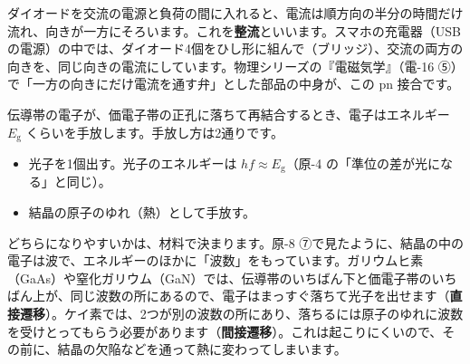 ダイオードを交流の電源と負荷の間に入れると、電流は順方向の半分の時間だけ流れ、向きが一方にそろいます。これを\textbf{整流}といいます。スマホの充電器（USB の電源）の中では、ダイオード4個をひし形に組んで（ブリッジ）、交流の両方の向きを、同じ向きの電流にしています。物理シリーズの『電磁気学』（電-16 ⑤）で「一方の向きにだけ電流を通す弁」とした部品の中身が、この pn 接合です。

\begin{phmodel}[理想ダイオードの式]
\end{phmodel}

\label{ph:原-9:sec8}
伝導帯の電子が、価電子帯の正孔に落ちて再結合するとき、電子はエネルギー $E_{\mathrm g}$ くらいを手放します。手放し方は2通りです。
\begin{itemize}[label={\color{bkTheme}●}, leftmargin=1.6\zw, itemsep=1pt, topsep=2pt]
\item 光子を1個出す。光子のエネルギーは $hf\approx E_{\mathrm g}$（原-4 の「準位の差が光になる」と同じ）。
\item 結晶の原子のゆれ（熱）として手放す。
\end{itemize}
どちらになりやすいかは、材料で決まります。原-8 ⑦で見たように、結晶の中の電子は波で、エネルギーのほかに「波数」をもっています。ガリウムヒ素（GaAs）や窒化ガリウム（GaN）では、伝導帯のいちばん下と価電子帯のいちばん上が、同じ波数の所にあるので、電子はまっすぐ落ちて光子を出せます（\textbf{直接遷移}）。ケイ素では、2つが別の波数の所にあり、落ちるには原子のゆれに波数を受けとってもらう必要があります（\textbf{間接遷移}）。これは起こりにくいので、その前に、結晶の欠陥などを通って熱に変わってしまいます。

